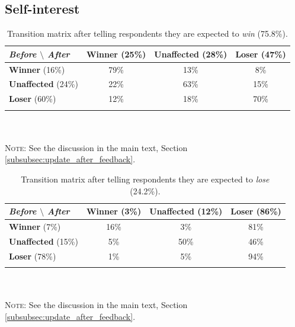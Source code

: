 \documentclass[12pt]{article} %
\begin{document}
\begin{appendices}
\vspace*{1.5cm}

\subsection{Self-interest \label{subsec:app_perception_si}}

\medskip

\begin{table}[H]
\caption[table]{Transition matrix after telling respondents they are expected to \textit{win} (75.8\%).}
{\label{table:transition_matrix_positive_feedback}}
\centering
\begin{tabular}{lccc}
\textit{Before $\setminus$ After} & \textbf{Winner} (25\%) & \textbf{Unaffected} (28\%) & \textbf{Loser} (47\%) \\
\hline
\textbf{Winner} (16\%) & 79\% & 13\% & 8\%\\
\textbf{Unaffected} (24\%) & 22\% & 63\% & 15\% \\
\textbf{Loser} (60\%) & 12\% & 18\% & 70\% \\ \\
\end{tabular}
{\footnotesize \\ $\quad$ \\[-3ex] \textsc{Note:} See the discussion in the main text, Section \vref{subsubsec:update_after_feedback}.}
\end{table}

\vspace{1cm}

\begin{table}[H]
\caption[table]{Transition matrix after telling respondents they are expected to \textit{lose} (24.2\%).}
{\label{table:transition_matrix_negative_feedback}}
\centering
\begin{tabular}{lccc}
\textit{Before $\setminus$ After} & \textbf{Winner} (3\%) & \textbf{Unaffected} (12\%) & \textbf{Loser} (86\%) \\
\hline
\textbf{Winner} (7\%) & 16\% & 3\% & 81\% \\
\textbf{Unaffected} (15\%) & 5\% & 50\% & 46\% \\
\textbf{Loser} (78\%) & 1\% & 5\% & 94\% \\ \\
\end{tabular}
{\footnotesize \\ $\quad$ \\[-3ex] \textsc{Note:} See the discussion in the main text, Section \vref{subsubsec:update_after_feedback}.}
\end{table}


\end{appendices}
\end{document}
